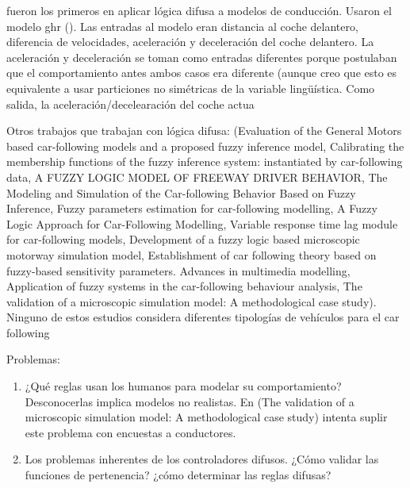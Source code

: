 \cite{Kikuchi1992} fueron los primeros en aplicar lógica difusa a modelos de conducción. Usaron el modelo \gls{ghr} (\cite{Chandler1958}). Las entradas al modelo eran distancia al coche delantero, diferencia de velocidades, aceleración y deceleración del coche delantero. La aceleración y deceleración se toman como entradas diferentes porque postulaban que el comportamiento antes ambos casos era diferente (aunque creo que esto es equivalente a usar particiones no simétricas de la variable lingüística. Como salida, la aceleración/decelearación del coche actua

Otros trabajos que trabajan con lógica difusa: (Evaluation of the General Motors based car-following models and a proposed fuzzy inference model, Calibrating the membership functions of the fuzzy inference system: instantiated by car-following data, A FUZZY LOGIC MODEL OF FREEWAY DRIVER BEHAVIOR, The Modeling and Simulation of the Car-following Behavior Based on Fuzzy Inference, Fuzzy parameters estimation for car-following modelling, A Fuzzy Logic Approach for Car-Following Modelling, Variable response time lag module for car-following models, Development of a fuzzy logic based microscopic motorway simulation model, Establishment of car following theory based on fuzzy-based sensitivity parameters. Advances in multimedia modelling, Application of fuzzy systems in the car-following behaviour analysis, The validation of a microscopic simulation model: A methodological case study). Ninguno de estos estudios considera diferentes tipologías de vehículos para el car following

Problemas:

\begin{enumerate}
	\item ¿Qué reglas usan los humanos para modelar su comportamiento? Desconocerlas implica modelos no realistas. En (The validation of a microscopic simulation model: A methodological case study) intenta suplir este problema con encuestas a conductores.
	\item Los problemas inherentes de los controladores difusos. ¿Cómo validar las funciones de pertenencia? ¿cómo determinar las reglas difusas?
\end{enumerate}

